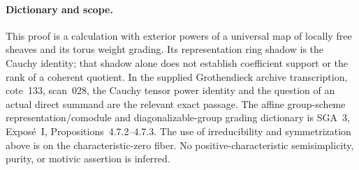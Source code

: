 \paragraph{Dictionary and scope.}
This proof is a calculation with exterior powers of a universal map of
locally free sheaves and its torus weight grading. Its representation
ring shadow is the Cauchy identity; that shadow alone does not establish
coefficient support or the rank of a coherent quotient. In the supplied
Grothendieck archive transcription, cote~133, scan~028, the Cauchy tensor
power identity and the question of an actual direct summand are the
relevant exact passage. The affine group-scheme representation/comodule
and diagonalizable-group grading dictionary is SGA~3, Expos\'e~I,
Propositions~4.7.2--4.7.3. The use of irreducibility and symmetrization
above is on the characteristic-zero fiber. No positive-characteristic
semisimplicity, purity, or motivic assertion is inferred.

